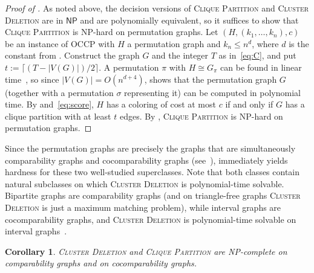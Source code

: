 \documentclass[a4paper,fleqn]{cas-sc}
\newtheorem{cor}[thm]{Corollary}
\theoremstyle{remark}
\theoremstyle{plain}
\newcommand{\cd}{\textsc{Cluster Deletion}}
\newcommand{\cp}{\textsc{Clique Partition}}
\begin{document}
\begin{proof}[Proof of ]
    As noted above, the decision versions of \cp{} and \cd{} are in $\mathsf{NP}$ and are polynomially equivalent, so it suffices to show that \cp{} is NP-hard on permutation graphs.  Let $(H, (k_1, \dots, k_n), c)$ be an instance of OCCP with $H$ a permutation graph and $k_n \leq n^d$, where $d$ is the constant from .  Construct the graph $G$ and the integer $T$ as in~\eqref{eq:C}, and put $t := \lceil (T - |V(G)|)/2 \rceil$.  A permutation $\pi$ with $H \cong G_\pi$ can be found in linear time~\cite{MS99}, so since $|V(G)|=O(n^{d+4})$,  shows that the permutation graph $G$ (together with a permutation $\sigma$ representing it) can be computed in polynomial time.  By  and~\eqref{eq:score}, $H$ has a coloring of cost at most $c$ if and only if $G$ has a clique partition with at least $t$ edges.  By , \cp{} is NP-hard on permutation graphs.
\end{proof}

Since the permutation graphs are precisely the graphs that are simultaneously comparability graphs and cocomparability graphs (see~\cite{golumbic2004}),  immediately yields hardness for these two well-studied superclasses.  Note that both classes contain natural subclasses on which \cd{} is polynomial-time solvable. Bipartite graphs are comparability graphs (and on triangle-free graphs \cd{} is just a maximum matching problem), while interval graphs are cocomparability graphs, and \cd{} is polynomial-time solvable on interval graphs~\cite{BONOMO2015,konstantinidis2021cluster}.

\begin{cor} \label{cor:comparability}
    \cd{} and \cp{} are NP-complete on comparability graphs and on cocomparability graphs.
\end{cor}

\end{document}

